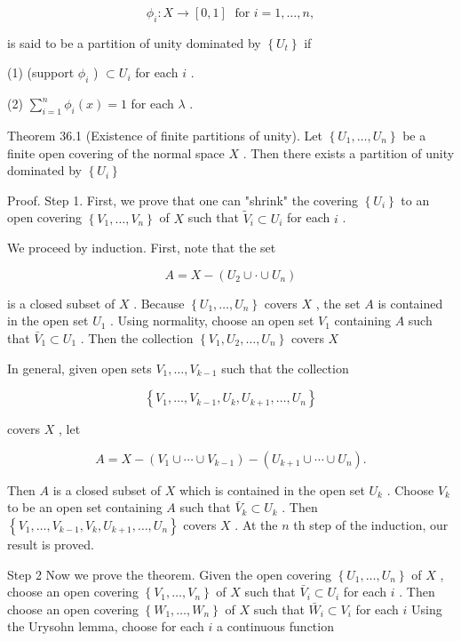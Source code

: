 \[
{\phi }_{i} : X \rightarrow  \left\lbrack  {0,1}\right\rbrack  \;\text{ for }i = 1,\ldots ,n,
\]

is said to be a partition of unity dominated by \(\left\{  {U}_{t}\right\}\) if

(1) (support \({\phi }_{i}\) ) \(\subset  {U}_{i}\) for each \(i\) .

(2) \(\mathop{\sum }\limits_{{i = 1}}^{n}{\phi }_{i}\left( x\right)  = 1\) for each \(\lambda\) .

Theorem 36.1 (Existence of finite partitions of unity). Let \(\left\{  {{U}_{1},\ldots ,{U}_{n}}\right\}\) be a finite open covering of the normal space \(X\) . Then there exists a partition of unity dominated by \(\left\{  {U}_{i}\right\}\)

Proof. Step 1. First, we prove that one can "shrink" the covering \(\left\{  {U}_{i}\right\}\) to an open covering \(\left\{  {{V}_{1},\ldots ,{V}_{n}}\right\}\) of \(X\) such that \({\widetilde{V}}_{i} \subset  {U}_{i}\) for each \(i\) .

We proceed by induction. First, note that the set

\[
A = X - \left( {{U}_{2} \cup   \cdot   \cup  {U}_{n}}\right)
\]

is a closed subset of \(X\) . Because \(\left\{  {{U}_{1},\ldots ,{U}_{n}}\right\}\) covers \(X\) , the set \(A\) is contained in the open set \({U}_{1}\) . Using normality, choose an open set \({V}_{1}\) containing \(A\) such that \({\bar{V}}_{1} \subset  {U}_{1}\) . Then the collection \(\left\{  {{V}_{1},{U}_{2},\ldots ,{U}_{n}}\right\}\) covers \(X\)

In general, given open sets \({V}_{1},\ldots ,{V}_{k - 1}\) such that the collection

\[
\left\{  {{V}_{1},\ldots ,{V}_{k - 1},{U}_{k},{U}_{k + 1},\ldots ,{U}_{n}}\right\}
\]

covers \(X\) , let

\[
A = X - \left( {{V}_{1} \cup  \cdots  \cup  {V}_{k - 1}}\right)  - \left( {{U}_{k + 1} \cup  \cdots  \cup  {U}_{n}}\right) .
\]

Then \(A\) is a closed subset of \(X\) which is contained in the open set \({U}_{k}\) . Choose \({V}_{k}\) to be an open set containing \(A\) such that \({\bar{V}}_{k} \subset  {U}_{k}\) . Then \(\left\{  {{V}_{1},\ldots ,{V}_{k - 1},{V}_{k},{U}_{k + 1},\ldots ,{U}_{n}}\right\}\) covers \(X\) . At the \(n\) th step of the induction, our result is proved.

Step 2 Now we prove the theorem. Given the open covering \(\left\{  {{U}_{1},\ldots ,{U}_{n}}\right\}\) of \(X\) , choose an open covering \(\left\{  {{V}_{1},\ldots ,{V}_{n}}\right\}\) of \(X\) such that \({\bar{V}}_{i} \subset  {U}_{i}\) for each \(i\) . Then choose an open covering \(\left\{  {{W}_{1},\ldots ,{W}_{n}}\right\}\) of \(X\) such that \({\bar{W}}_{i} \subset  {V}_{i}\) for each \(i\) Using the Urysohn lemma, choose for each \(i\) a continuous function

